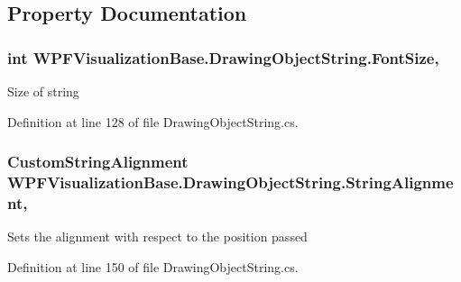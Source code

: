 \subsection{Property Documentation}
\subsubsection[{\texorpdfstring{Font\+Size}{FontSize}}]{\setlength{\rightskip}{0pt plus 5cm}int W\+P\+F\+Visualization\+Base.\+Drawing\+Object\+String.\+Font\+Size\hspace{0.3cm}{\ttfamily [get]}, {\ttfamily [set]}}\hypertarget{class_w_p_f_visualization_base_1_1_drawing_object_string_aec747f6f0f59a21ca124f46fdb0fac7e}{}\label{class_w_p_f_visualization_base_1_1_drawing_object_string_aec747f6f0f59a21ca124f46fdb0fac7e}


Size of string 



Definition at line 128 of file Drawing\+Object\+String.\+cs.

\subsubsection[{\texorpdfstring{String\+Alignment}{StringAlignment}}]{\setlength{\rightskip}{0pt plus 5cm}Custom\+String\+Alignment W\+P\+F\+Visualization\+Base.\+Drawing\+Object\+String.\+String\+Alignment\hspace{0.3cm}{\ttfamily [get]}, {\ttfamily [set]}}\hypertarget{class_w_p_f_visualization_base_1_1_drawing_object_string_a56827b7acaa5459d27992d969ab00f18}{}\label{class_w_p_f_visualization_base_1_1_drawing_object_string_a56827b7acaa5459d27992d969ab00f18}


Sets the alignment with respect to the position passed 



Definition at line 150 of file Drawing\+Object\+String.\+cs.

